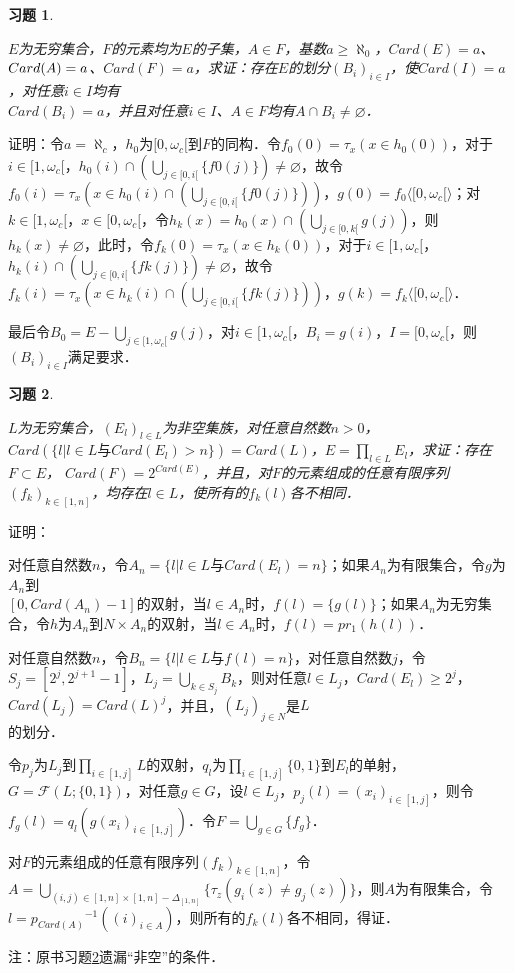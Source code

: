 \documentclass[12pt, a4paper, oneside]{book}
\newtheorem{exer}{习题}
\begin{document}
			\begin{exer}\label{exer181}
				\hfill\par
				$E$为无穷集合，$F$的元素均为$E$的子集，$A\in F$，基数$a\geq \aleph_0$，$Card(E)=a$、$Card(A)\\=a$、$Card(F)=a$，求证：存在$E$的划分$(B_i)_{i\in I}$，使$Card(I)=a$，对任意$i\in I$均有\\$Card(B_i)=a$，并且对任意$i\in I$、$A\in F$均有$A\cap B_i\neq \varnothing$．
			\end{exer}
			证明：令$a=\aleph_c$，$h_0$为$[0, \omega_c[$到$F$的同构．令$f_0(0)=\tau_x(x\in h_0(0))$，对于$i\in [1, \omega_c[$，$h_0(i)\cap(\bigcup\limits_{j\in [0, i[}\{f0(j)\})\neq \varnothing$，故令$f_0(i)=\tau_x(x\in h_0(i)\cap(\bigcup\limits_{j\in [0, i[}\{f0(j)\}))$，$g(0)=f_0\langle[0, \omega_c[\rangle$；对$k\in [1, \omega_c[$，$x\in [0, \omega_c[$，令$h_k(x)=h_0(x) \cap(\bigcup\limits_{j\in [0, k[}g(j))$，则$h_k(x)\neq \varnothing$，此时，令$f_k(0)=\tau_x(x\in h_k(0))$，对于$i\in [1, \omega_c[$，$h_k(i)\cap(\bigcup\limits_{j\in [0, i[}\{fk(j)\})\neq \varnothing$，故令$f_k(i)=\tau_x(x\in h_k(i)\cap(\bigcup\limits_{j\in [0, i[}\{fk(j)\}))$，$g(k)=f_k\langle[0, \omega_c[\rangle$．
			\par
			最后令$B_0=E-\bigcup\limits_{j\in [1, \omega_c[}g(j)$，对$i\in [1, \omega_c[$，$B_i=g(i)$，$I=[0, \omega_c[$，则$(B_i)_{i\in I}$满足要求．
			
			\begin{exer}\label{exer182}
				\hfill\par
				$L$为无穷集合，$(E_l)_{l\in L}$为非空集族，对任意自然数$n>0$，$Card(\{l|l\in L\text{与}Card(E_l)>n\})=Card(L)$，$E=\prod\limits_{l\in L}E_l$，求证：存在$F\subset E$， $Card(F)=2^{Card(E)}$，并且，对$F$的元素组成的任意有限序列$(f_k)_{k\in [1, n]}$，均存在$l\in L$，使所有的$f_k(l)$各不相同．
			\end{exer}
			证明：
			\par
			对任意自然数$n$，令$A_n=\{l|l\in L\text{与}Card(E_l)=n\}$；如果$A_n$为有限集合，令$g$为$A_n$到\\$[0, Card(A_n)-1]$的双射，当$l\in A_n$时，$f(l)=\{g(l)\}$；如果$A_n$为无穷集合，令$h$为$A_n$到$N\times A_n$的双射，当$l\in A_n$时，$f(l)=pr_1(h(l))$．
			\par
			对任意自然数$n$，令$B_n=\{l|l\in L\text{与}f(l)=n\}$，对任意自然数$j$，令$S_j=[2^j, 2^{j+1}-1]$，$L_j=\bigcup\limits_{k\in S_j}B_k$，则对任意$l\in L_j$，$Card(E_l)\geq 2^j$，$Card(L_j)=Card(L)^j$，并且，$(L_j)_{j\in N}$是$L$\\的划分．
			\par
			令$p_j$为$L_j$到$\prod\limits_{i\in [1, j]}L$的双射，$q_l$为$\prod\limits_{i\in [1, j]}\{0, 1\}$到$E_l$的单射，$G=\mathcal{F}(L; \{0, 1\})$，对任意$g\in G$，设$l\in L_j$，$p_j(l)=(x_i)_{i\in [1, j]}$，则令$f_g(l)=q_l(g(x_i)_{i\in [1, j]})$．令$F=\bigcup\limits_{g\in G}\{f_g\}$．
			\par
			对$F$的元素组成的任意有限序列$(f_k)_{k\in [1, n]}$，令$A=\bigcup\limits_{(i, j)\in [1, n]\times [1, n]-\Delta_{[1, n]}}\{\tau_z(g_i(z)\neq g_j(z))\}$，则$A$为有限集合，令$l={p_{Card(A)}}^{-1}((i)_{i\in A})$，则所有的$f_k(l)$各不相同，得证．
			\par
			注：原书习题\ref{exer182}遗漏“非空”的条件．
			
\end{document}

